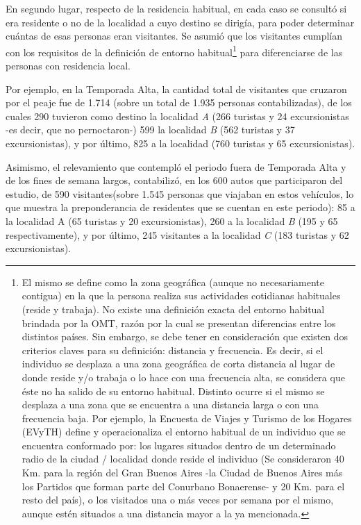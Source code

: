 \documentclass[
]{book}
\begin{document}
En segundo lugar, respecto de la residencia habitual, en cada caso se consultó si era residente o no de la localidad a cuyo destino se dirigía, para poder determinar cuántas de esas personas eran visitantes. Se asumió que los visitantes cumplían con los requisitos de la definición de entorno habitual\footnote{El mismo se define como la zona geográfica (aunque no necesariamente contigua) en la que la persona realiza sus actividades cotidianas habituales (reside y trabaja). No existe una definición exacta del entorno habitual brindada por la OMT, razón por la cual se presentan diferencias entre los distintos países. Sin embargo, se debe tener en consideración que existen dos criterios claves para su definición: distancia y frecuencia. Es decir, si el individuo se desplaza a una zona geográfica de corta distancia al lugar de donde reside y/o trabaja o lo hace con una frecuencia alta, se considera que éste no ha salido de su entorno habitual. Distinto ocurre si el mismo se desplaza a una zona que se encuentra a una distancia larga o con una frecuencia baja. Por ejemplo, la Encuesta de Viajes y Turismo de los Hogares (EVyTH) define y operacionaliza el entorno habitual de un individuo que se encuentra conformado por: los lugares situados dentro de un determinado radio de la ciudad / localidad donde reside el individuo (Se consideraron 40 Km. para la región del Gran Buenos Aires -la Ciudad de Buenos Aires más los Partidos que forman parte del Conurbano Bonaerense- y 20 Km. para el resto del país), o los visitados una o más veces por semana por el mismo, aunque estén situados a una distancia mayor a la ya mencionada.} para diferenciarse de las personas con residencia local.

Por ejemplo, en la Temporada Alta, la cantidad total de visitantes que cruzaron por el peaje fue de 1.714 (sobre un total de 1.935 personas contabilizadas), de los cuales 290 tuvieron como destino la localidad \emph{A} (266 turistas y 24 excursionistas -es decir, que no pernoctaron-) 599 la localidad \emph{B} (562 turistas y 37 excursionistas), y por último, 825 a la localidad (760 turistas y 65 excursionistas).

Asimismo, el relevamiento que contempló el periodo fuera de Temporada Alta y de los fines de semana largos, contabilizó, en los 600 autos que participaron del estudio, de 590 visitantes(sobre 1.545 personas que viajaban en estos vehículos, lo que muestra la preponderancia de residentes que se cuentan en este periodo): 85 a la localidad A (65 turistas y 20 excursionistas), 260 a la localidad \emph{B} (195 y 65 respectivamente), y por último, 245 visitantes a la localidad \emph{C} (183 turistas y 62 excursionistas).
\end{document}
